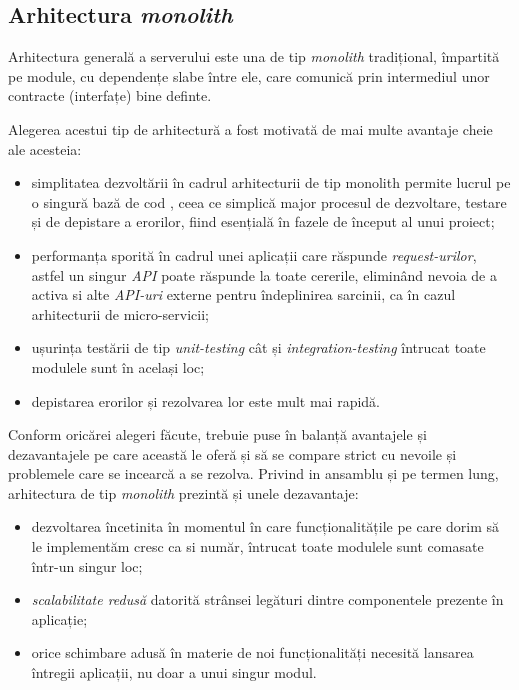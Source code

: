 \subsection*{Arhitectura \textit{monolith}}

Arhitectura generală a serverului este una de tip \textit{monolith} tradițional, împartită pe module, cu dependențe slabe între ele, care comunică prin intermediul unor contracte (interfațe) bine definte.

Alegerea acestui tip de arhitectură a fost motivată de mai multe avantaje cheie ale acesteia: 
\begin{itemize}
	\item simplitatea dezvoltării în cadrul arhitecturii de tip monolith permite lucrul pe o singură bază de cod , ceea ce simplică major procesul de dezvoltare, testare și de depistare a erorilor, fiind esențială în fazele de început al unui proiect;
	
	\item  performanța sporită în cadrul unei aplicații care răspunde \textit{request-urilor}, astfel un singur \textit{API} poate răspunde la toate cererile, eliminând nevoia de a activa si alte \textit{API-uri} externe pentru îndeplinirea sarcinii, ca în cazul arhitecturii de micro-servicii;
	
	\item ușurința testării de tip \textit{unit-testing} cât și \textit{integration-testing} întrucat toate modulele sunt în același loc;
	
	\item  depistarea erorilor și rezolvarea lor este mult mai rapidă.
\end{itemize}

Conform oricărei alegeri făcute, trebuie puse în balanță avantajele și dezavantajele pe care această le oferă și  să se compare strict cu nevoile și problemele care se incearcă a se rezolva. Privind in ansamblu și pe termen lung, arhitectura de tip \textit{monolith} prezintă și unele dezavantaje: 

\begin{itemize}

 \item dezvoltarea încetinita în momentul în care funcționalitățile pe care dorim să le implementăm cresc ca si număr, întrucat toate modulele sunt comasate într-un singur loc;
 
 \item \textit{scalabilitate redusă} datorită strânsei legături dintre componentele prezente în aplicație;
 
 \item 	orice schimbare adusă în materie de noi funcționalități necesită lansarea întregii aplicații, nu doar a unui singur modul.

\end{itemize}

